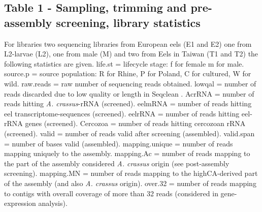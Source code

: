 \documentclass[10pt]{bmc_article}
\newenvironment{bmcformat}{\begin{raggedright}\baselineskip20pt\sloppy\setboolean{publ}{false}}{\end{raggedright}\baselineskip20pt\sloppy}
\begin{document}
\begin{bmcformat}
\subsection*{Table 1 - Sampling, trimming and pre-assembly screening,
  library statistics}

For libraries two sequencing libraries from European eels (E1 and E2)
one from L2-larvae (L2), one from male (M) and two from Eels in Taiwan
(T1 and T2) the following statistics are given. life.st = lifecycle
stage: f for female m for male. source.p = source population: R for
Rhine, P for Poland, C for cultured, W for wild. raw.reads = raw
number of sequencing reads obtained. lowqal = number of reads
discarded due to low quality or length in Seqclean
\cite{tgicl_pertea}. AcrRNA = number of reads hitting
\textit{A. crassus}-rRNA (screened). eelmRNA = number of reads hitting
eel transcriptome-sequences (screened). eelrRNA = number of reads
hitting eel-rRNA genes (screened). Cercozoa = number of reads hitting
cercozoan rRNA (screened). valid = number of reads valid after
screening (assembled). valid.span = number of bases valid (assembled).
mapping.unique = number of reads mapping uniquely to the
assembly. mapping.Ac = number of reads mapping to the part of the
assembly considered \textit{A. crassus} origin (see post-assembly
screening). mapping.MN = number of reads mapping to the highCA-derived
part of the assembly (and also \textit{A. crassus} origin). over.32 =
number of reads mapping to contigs with overall coverage of more than
32 reads (considered in gene-expression analysis).


\end{bmcformat}
\end{document}
